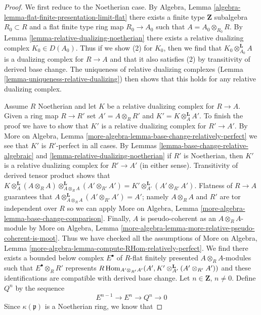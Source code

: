 \begin{proof}
We first reduce to the Noetherian case. By
Algebra, Lemma \ref{algebra-lemma-flat-finite-presentation-limit-flat}
there exists a finite type $\mathbf{Z}$ subalgebra $R_0 \subset R$
and a flat finite type ring map $R_0 \to A_0$ such that
$A = A_0 \otimes_{R_0} R$. By Lemma \ref{lemma-relative-dualizing-noetherian}
there exists a relative
dualizing complex $K_0 \in D(A_0)$.
Thus if we show (2) for $K_0$, then we find that
$K_0 \otimes_{A_0}^\mathbf{L} A$ is
a dualizing complex for $R \to A$ and that it also satisfies (2)
by transitivity of derived base change.
The uniqueness of relative dualizing complexes
(Lemma \ref{lemma-uniqueness-relative-dualizing})
then shows that this holds for
any relative dualizing complex.

\medskip\noindent
Assume $R$ Noetherian and let $K$ be a relative dualizing complex
for $R \to A$. Given a ring map $R \to R'$ set $A' = A \otimes_R R'$
and $K' = K \otimes_A^\mathbf{L} A'$. To finish the proof we have
to show that $K'$ is a relative dualizing complex for $R' \to A'$.
By More on Algebra, Lemma
\ref{more-algebra-lemma-base-change-relatively-perfect}
we see that $K'$ is $R'$-perfect in all cases.
By Lemmas \ref{lemma-base-change-relative-algebraic} and
\ref{lemma-relative-dualizing-noetherian}
if $R'$ is Noetherian, then $K'$ is a relative dualizing complex
for $R' \to A'$ (in either sense).
Transitivity of derived tensor product shows that
$K \otimes_A^\mathbf{L} (A \otimes_R A)
\otimes_{A \otimes_R A}^\mathbf{L} (A' \otimes_{R'} A') =
K' \otimes_{A'}^\mathbf{L} (A' \otimes_{R'} A')$.
Flatness of $R \to A$ guarantees that
$A \otimes_{A \otimes_R A}^\mathbf{L} (A' \otimes_{R'} A') = A'$;
namely $A \otimes_R A$ and $R'$ are tor independent over $R$
so we can apply More on Algebra, Lemma
\ref{more-algebra-lemma-base-change-comparison}.
Finally, $A$ is pseudo-coherent as an $A \otimes_R A$-module
by More on Algebra, Lemma
\ref{more-algebra-lemma-more-relative-pseudo-coherent-is-moot}. Thus
we have checked all the assumptions of
More on Algebra, Lemma
\ref{more-algebra-lemma-compute-RHom-relatively-perfect}.
We find there exists a bounded below complex
$E^\bullet$ of $R$-flat finitely presented $A \otimes_R A$-modules
such that $E^\bullet \otimes_R R'$ represents
$R\mathop{\mathrm{Hom}}\nolimits_{A' \otimes_{R'} A'}(A',
K' \otimes_{A'}^\mathbf{L} (A' \otimes_{R'} A'))$
and these identifications are compatible with derived base change.
Let $n \in \mathbf{Z}$, $n \not = 0$.
Define $Q^n$ by the sequence
$$
E^{n - 1} \to E^n \to Q^n \to 0
$$
Since $\kappa(\mathfrak p)$ is a Noetherian ring, we know that

\end{proof}
